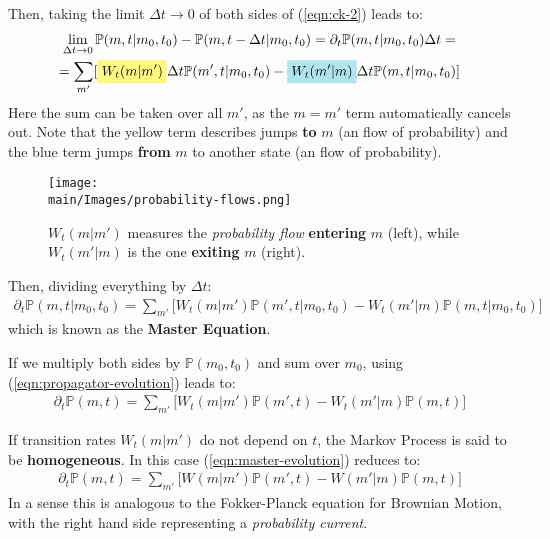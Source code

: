 \documentclass[../../main.tex]{subfiles}
\begin{document}
\medskip

Then, taking the limit $\Delta t \to 0$ of both sides of (\ref{eqn:ck-2}) leads to:
\begin{align*}
    \lim_{\Delta t \to 0} \mathbb{P}(m,t|m_0,t_0) - \mathbb{P}(m,t-\Delta t|m_0,t_0) = \partial_t \mathbb{P}(m,t|m_0,t_0) \Delta t = \span \\
    =\sum_{m'} [\hlc{Yellow}{W_t(m|m') }\Delta t \mathbb{P}(m',t|m_0,t_0) - \hlc{SkyBlue}{W_t(m'|m)} \Delta t \mathbb{P}(m,t|m_0,t_0)]  \span
\end{align*}
Here the sum can be taken over all $m'$, as the $m=m'$ term automatically cancels out. Note that the yellow term describes jumps \textbf{to}  $m$ (an  flow of probability) and the blue term jumps \textbf{from} $m$ to another state (an  flow of probability).

\begin{figure}[H]
    \centering
    \texttt{[image: \\main/Images/probability-flows.png]}
    \caption{$W_t(m|m')$ measures the \textit{probability flow} \textbf{entering} $m$ (left), while $W_t(m'|m)$ is the one \textbf{exiting} $m$ (right).}
    \label{fig:probability-flows}
\end{figure}

Then, dividing everything by $\Delta t$:
\begin{align}\label{eqn:MasterEquation}
    \partial_t \mathbb{P}(m,t|m_0,t_0) = \sum_{m'} \Big[ W_t(m|m') \mathbb{P}(m',t|m_0,t_0) - W_t(m'|m) \mathbb{P}(m,t|m_0,t_0)\Big]
\end{align}
which is known as the \textbf{Master Equation}. 

If we multiply both sides by $\mathbb{P}(m_0,t_0)$ and sum over $m_0$, using (\ref{eqn:propagator-evolution}) leads to:
\begin{align}\label{eqn:master-evolution}
    \partial_t \mathbb{P}(m,t) = \sum_{m'} \Big[W_t(m|m') \mathbb{P}(m',t) - W_t(m'|m) \mathbb{P}(m,t) \Big]
\end{align}

If transition rates $W_t(m|m')$ do not depend on $t$, the Markov Process is said to be \textbf{homogeneous}. In this case (\ref{eqn:master-evolution}) reduces to:
\begin{align}\label{eqn:pdf-evolution}
    \partial_t \mathbb{P}(m,t) = \sum_{m'} \Big[W(m|m') \mathbb{P}(m',t) - W(m'|m)\mathbb{P}(m,t)\Big]
\end{align}
In a sense this is analogous to the Fokker-Planck equation for Brownian Motion, with the right hand side representing a \textit{probability current}. 
\end{document}
